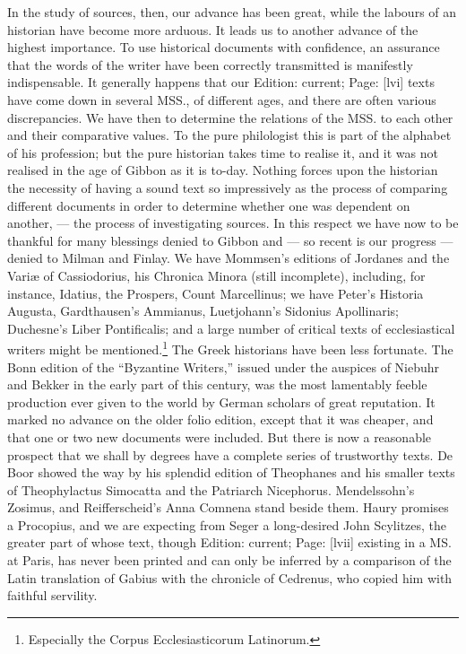 In the study of sources, then, our advance has been great, while the labours of an historian have become more arduous. It leads us to another advance of the highest importance. To use historical documents with confidence, an assurance that the words of the writer have been correctly transmitted is manifestly indispensable. It generally happens that our Edition: current; Page: [lvi] texts have come down in several MSS., of different ages, and there are often various discrepancies. We have then to determine the relations of the MSS. to each other and their comparative values. To the pure philologist this is part of the alphabet of his profession; but the pure historian takes time to realise it, and it was not realised in the age of Gibbon as it is to-day. Nothing forces upon the historian the necessity of having a sound text so impressively as the process of comparing different documents in order to determine whether one was dependent on another, \texthebrew{—} the process of investigating sources. In this respect we have now to be thankful for many blessings denied to Gibbon and \texthebrew{—} so recent is our progress \texthebrew{—} denied to Milman and Finlay. We have Mommsen\texthebrew{}’s editions of Jordanes and the Variæ of Cassiodorius, his Chronica Minora (still incomplete), including, for instance, Idatius, the Prospers, Count Marcellinus; we have Peter\texthebrew{}’s Historia Augusta, Gardthausen\texthebrew{}’s Ammianus, Luetjohann\texthebrew{}’s Sidonius Apollinaris; Duchesne\texthebrew{}’s Liber Pontificalis; and a large number of critical texts of ecclesiastical writers might be mentioned.\footnote{Especially the Corpus Ecclesiasticorum Latinorum.} The Greek historians have been less fortunate. The Bonn edition of the \texthebrew{“}Byzantine Writers,\texthebrew{}” issued under the auspices of Niebuhr and Bekker in the early part of this century, was the most lamentably feeble production ever given to the world by German scholars of great reputation. It marked no advance on the older folio edition, except that it was cheaper, and that one or two new documents were included. But there is now a reasonable prospect that we shall by degrees have a complete series of trustworthy texts. De Boor showed the way by his splendid edition of Theophanes and his smaller texts of Theophylactus Simocatta and the Patriarch Nicephorus. Mendelssohn\texthebrew{}’s Zosimus, and Reifferscheid\texthebrew{}’s Anna Comnena stand beside them. Haury promises a Procopius, and we are expecting from Seger a long-desired John Scylitzes, the greater part of whose text, though Edition: current; Page: [lvii] existing in a MS. at Paris, has never been printed and can only be inferred by a comparison of the Latin translation of Gabius with the chronicle of Cedrenus, who copied him with faithful servility.

